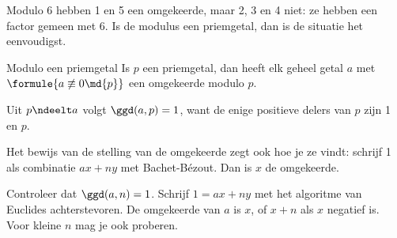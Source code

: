 Modulo 6 hebben 1 en 5 een omgekeerde, maar 2, 3 en 4 niet: ze hebben een factor gemeen met 6. Is de modulus een priemgetal, dan is de situatie het eenvoudigst.

\begin{theorie}
\begin{stelling}{Modulo een priemgetal}
Is $p$ een priemgetal, dan heeft elk geheel getal $a$ met $\formule{a \not\equiv 0 \md{p}}$ een omgekeerde modulo $p$.
\end{stelling}

\begin{bewijs}
Uit $p \ndeelt a$ volgt $\ggd(a, p) = 1$, want de enige positieve delers van $p$ zijn 1 en $p$.
\end{bewijs}
\end{theorie}

Het bewijs van de stelling van de omgekeerde zegt ook hoe je ze vindt: schrijf 1 als combinatie $ax + ny$ met Bachet-Bézout. Dan is $x$ de omgekeerde.


\begin{werkwijze}
Controleer dat $\ggd(a, n) = 1$. Schrijf $1 = ax + ny$ met het algoritme van Euclides achterstevoren. De omgekeerde van $a$ is $x$, of $x + n$ als $x$ negatief is. Voor kleine $n$ mag je ook proberen.
\end{werkwijze}


\begin{oefeningen}
\end{oefeningen}

